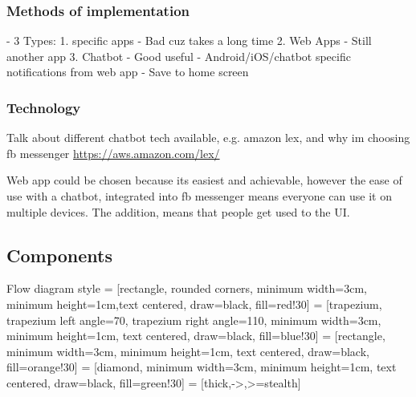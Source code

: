 \subsubsection*{Methods of implementation}
- 3 Types:
  1. specific apps
    - Bad cuz takes a long time
  2. Web Apps
    - Still another app
  3. Chatbot
    - Good useful
- Android/iOS/chatbot specific notifications from web app
- Save to home screen

\subsubsection*{Technology}
Talk about different chatbot tech available, e.g. amazon lex, and why im choosing fb messenger
\url{https://aws.amazon.com/lex/}

Web app could be chosen because its easiest and achievable, however the ease of use with a chatbot, integrated into fb messenger means everyone can use it on multiple devices. The addition, means that people get used to the UI.

\subsection{Components}

Flow diagram style
 = [rectangle, rounded corners, minimum width=3cm, minimum height=1cm,text centered, draw=black, fill=red!30]
 = [trapezium, trapezium left angle=70, trapezium right angle=110, minimum width=3cm, minimum height=1cm, text centered, draw=black, fill=blue!30]
 = [rectangle, minimum width=3cm, minimum height=1cm, text centered, draw=black, fill=orange!30]
 = [diamond, minimum width=3cm, minimum height=1cm, text centered, draw=black, fill=green!30]
 = [thick,->,>=stealth]


